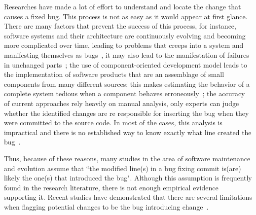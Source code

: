 \documentclass[a4paper, 12pt]{book}
\begin{document}
Researches have made a lot of effort to understand and locate the change that causes a fixed bug. This process is not as easy as it would appear at first glance. There are many factors that prevent the success of this process, for instance, software systems and their architecture are continuously evolving and becoming more complicated over time, leading to problems that creeps into a system and manifesting themselves as bugs~\cite{le2016architectural}, it may also lead to the manifestation of failures in unchanged parts~\cite{german2009change}; the use of component-oriented development model leads to the implementation of software products that are an assemblage of small components from many different sources; this makes estimating the behavior of a complete system tedious when a component behaves erroneously~\cite{duraes2006emulation}; the accuracy of current approaches rely heavily on manual analysis, only experts can judge whether the identified changes are re responsible for inserting the bug when they were committed to the source code. In most of the cases, this analysis is impractical and there is no established way to know exactly what line created the bug~\cite{da2016framework}.

Thus, because of these reasons, many studies in the area of software maintenance and evolution assume that ``the modified line(s) in a bug fixing commit is(are) likely the one(s) that introduced the bug". Although this assumption is frequently found in the research literature, there is not enough empirical evidence supporting it. Recent  studies have demonstrated that there are several limitations when flagging potential changes to be the bug introducing change~\cite{da2016framework,rodriguez2018reproducibility}.
\end{document}

